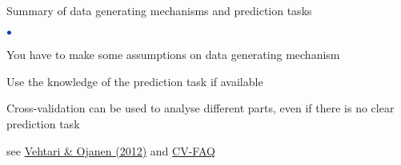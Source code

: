 \documentclass[english,t]{beamer}
\newenvironment{list1}{
   \begin{list}{$\color{list1}\bullet$}{\itemsep=6pt}}{
  \end{list}}
\begin{document}
\begin{frame}{}

{\Large\color{navyblue} Summary of data generating mechanisms and prediction tasks}

\begin{list1}
\item You have to make some assumptions on data generating mechanism
\item Use the knowledge of the prediction task if available
\item Cross-validation can be used to analyse different parts, even if
  there is no clear prediction task
\end{list1}

\vspace{7.5\baselineskip}
{ \small see \href{http://dx.doi.org/10.1214/12-SS102}{Vehtari \& Ojanen (2012)} and \href{https://users.aalto.fi/~ave/modelselection/CV-FAQ.html}{CV-FAQ}}

\end{frame}




  
\end{document}
